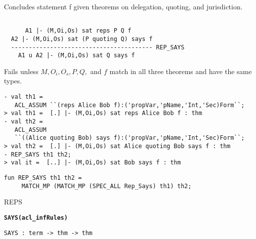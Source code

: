 \SYNOPSIS
Concludes statement f given theorems on delegation, quoting, and 
jurisdiction.

\DESCRIBE
\begin{verbatim}

      A1 |- (M,Oi,Os) sat reps P Q f  
  A2 |- (M,Oi,Os) sat (P quoting Q) says f
  ---------------------------------------- REP_SAYS
    A1 u A2 |- (M,Oi,Os) sat Q says f
\end{verbatim}

\FAILURE 
Fails unless $M, O_i, O_s, P, Q,$ and $f$ match in all three
theorems and have the same types.

\EXAMPLE

\begin{holboxed}
\begin{verbatim}
- val th1 = 
   ACL_ASSUM ``(reps Alice Bob f):('propVar,'pName,'Int,'Sec)Form``;
> val th1 =  [.] |- (M,Oi,Os) sat reps Alice Bob f : thm
- val th2 = 
   ACL_ASSUM 
   ``((Alice quoting Bob) says f):('propVar,'pName,'Int,'Sec)Form``;
> val th2 =  [.] |- (M,Oi,Os) sat Alice quoting Bob says f : thm
- REP_SAYS th1 th2;
> val it =  [..] |- (M,Oi,Os) sat Bob says f : thm
\end{verbatim}
\end{holboxed}
\IMPLEMENTATION
\begin{holboxed}
\begin{verbatim}
fun REP_SAYS th1 th2 = 
     MATCH_MP (MATCH_MP (SPEC_ALL Rep_Says) th1) th2;
\end{verbatim}
\end{holboxed}

\SEEALSO
REPS
\ENDDOC


\begin{holboxed}
  \begin{Large}
    \textbf{\texttt{SAYS}}\hfill{}\textbf{\texttt{(acl\_infRules)}}
  \end{Large}
\end{holboxed}

\begin{verbatim}
SAYS : term -> thm -> thm
\end{verbatim}

